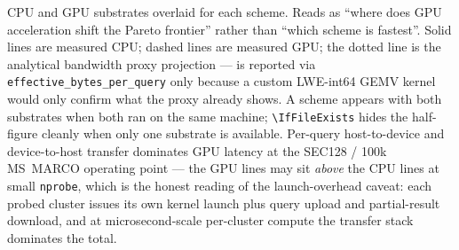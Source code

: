 CPU and GPU substrates overlaid for each scheme. Reads as
``where does GPU acceleration shift the Pareto frontier'' rather
than ``which scheme is fastest''. Solid lines are measured CPU;
dashed lines are measured GPU; the dotted \tiptoe line is the
analytical bandwidth proxy projection --- \tiptoe is reported via
\texttt{effective\_bytes\_per\_query} only because a custom
LWE-int64 GEMV kernel would only confirm what the proxy already
shows. A scheme appears with both substrates when both ran on
the same machine; \texttt{\textbackslash IfFileExists} hides the
half-figure cleanly when only one substrate is available.
Per-query host-to-device and device-to-host transfer dominates
GPU latency at the SEC128 / 100k MS~MARCO operating point --- the
GPU lines may sit \emph{above} the CPU lines at small
\texttt{nprobe}, which is the honest reading of the
launch-overhead caveat: each probed cluster issues its own kernel
launch plus query upload and partial-result download, and at
microsecond-scale per-cluster compute the transfer stack
dominates the total.
